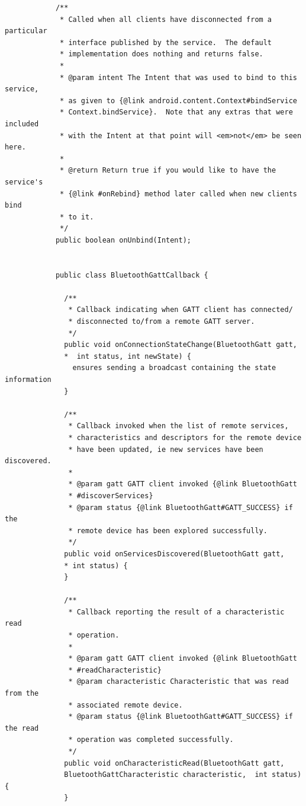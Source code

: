 \begin{lstlisting}
            /**
             * Called when all clients have disconnected from a particular 
             * interface published by the service.  The default 
             * implementation does nothing and returns false.
             *
             * @param intent The Intent that was used to bind to this service,
             * as given to {@link android.content.Context#bindService
             * Context.bindService}.  Note that any extras that were included 
             * with the Intent at that point will <em>not</em> be seen here.
             *
             * @return Return true if you would like to have the service's
             * {@link #onRebind} method later called when new clients bind 
             * to it.
             */
            public boolean onUnbind(Intent);


            public class BluetoothGattCallback {

              /**
               * Callback indicating when GATT client has connected/
               * disconnected to/from a remote GATT server.
               */
              public void onConnectionStateChange(BluetoothGatt gatt,
              *  int status, int newState) {
                ensures sending a broadcast containing the state information
              }

              /**
               * Callback invoked when the list of remote services, 
               * characteristics and descriptors for the remote device 
               * have been updated, ie new services have been discovered.
               *
               * @param gatt GATT client invoked {@link BluetoothGatt
               * #discoverServices}
               * @param status {@link BluetoothGatt#GATT_SUCCESS} if the 
               * remote device has been explored successfully.
               */
              public void onServicesDiscovered(BluetoothGatt gatt, 
              * int status) {
              }

              /**
               * Callback reporting the result of a characteristic read 
               * operation.
               *
               * @param gatt GATT client invoked {@link BluetoothGatt
               * #readCharacteristic}
               * @param characteristic Characteristic that was read from the 
               * associated remote device.
               * @param status {@link BluetoothGatt#GATT_SUCCESS} if the read 
               * operation was completed successfully.
               */
              public void onCharacteristicRead(BluetoothGatt gatt, 
              BluetoothGattCharacteristic characteristic,  int status) {
              }


\end{lstlisting}
